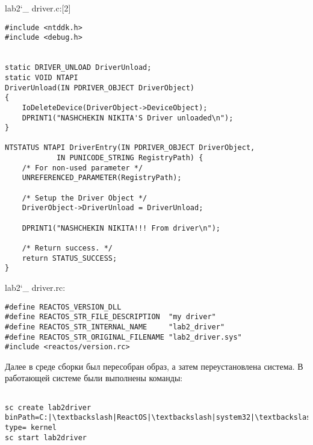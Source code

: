 \documentclass[a4paper, 14pt]{extarticle}
\begin{document}
\begin{flushleft}
lab2\char`_ driver.c:[2]
\end{flushleft}

\begin{verbatim}
#include <ntddk.h>
#include <debug.h>


static DRIVER_UNLOAD DriverUnload;
static VOID NTAPI
DriverUnload(IN PDRIVER_OBJECT DriverObject)
{
    IoDeleteDevice(DriverObject->DeviceObject);
	DPRINT1("NASHCHEKIN NIKITA'S Driver unloaded\n");
}

NTSTATUS NTAPI DriverEntry(IN PDRIVER_OBJECT DriverObject,
            IN PUNICODE_STRING RegistryPath) {
    /* For non-used parameter */
    UNREFERENCED_PARAMETER(RegistryPath);
    
    /* Setup the Driver Object */
    DriverObject->DriverUnload = DriverUnload;

    DPRINT1("NASHCHEKIN NIKITA!!! From driver\n");
    
    /* Return success. */
    return STATUS_SUCCESS;
}
\end{verbatim}

\begin{flushleft}
lab2\char`_ driver.rc:
\end{flushleft}

\begin{verbatim}
#define REACTOS_VERSION_DLL
#define REACTOS_STR_FILE_DESCRIPTION  "my driver"
#define REACTOS_STR_INTERNAL_NAME     "lab2_driver"
#define REACTOS_STR_ORIGINAL_FILENAME "lab2_driver.sys"
#include <reactos/version.rc>
\end{verbatim}

\begin{flushleft}
Далее в среде сборки был пересобран образ, а затем переустановлена система. В работающей системе были выполнены команды:
\end{flushleft}

\begin{verbatim}

sc create lab2driver binPath=C:|\textbackslash|ReactOS|\textbackslash|system32|\textbackslash|drivers|\textbackslash|lab2_driver.sys type= kernel
sc start lab2driver

\end{verbatim}
\end{document}
